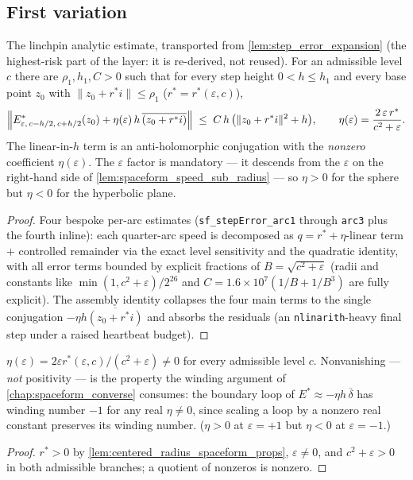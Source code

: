 \subsection{First variation}

\begin{lemma}
  \label{lem:spaceform_step_error_expansion}
  The linchpin analytic estimate, transported from
  \cref{lem:step_error_expansion} (the highest-risk part of the layer: it is
  re-derived, not reused). For an admissible level $c$ there are
  $\rho_1,h_1,C>0$ such that for every step height $0<h\le h_1$ and every
  base point $z_0$ with $\|z_0+r^\ast i\|\le\rho_1$
  ($r^\ast=r^\ast(\varepsilon,c)$),
  \[
    \Bigl\|E^\ast_{\varepsilon,\,c-h/2,\,c+h/2}(z_0)
      +\eta(\varepsilon)\,h\,\overline{(z_0+r^\ast i)}\Bigr\|
    \;\le\; C\,h\,\bigl(\|z_0+r^\ast i\|^2+h\bigr),
    \qquad
    \eta(\varepsilon)=\frac{2\,\varepsilon\, r^\ast}{c^2+\varepsilon}.
  \]
  The linear-in-$h$ term is an anti-holomorphic conjugation with the
  \emph{nonzero} coefficient $\eta(\varepsilon)$. The $\varepsilon$ factor is
  mandatory — it descends from the $\varepsilon$ on the right-hand side of
  \cref{lem:spaceform_speed_sub_radius} — so $\eta>0$ for the sphere but
  $\eta<0$ for the hyperbolic plane.
\end{lemma}

\begin{proof}
  \leanok
  Four bespoke per-arc estimates (\texttt{sf\_stepError\_arc1} through
  \texttt{arc3} plus the fourth inline): each quarter-arc speed is
  decomposed as
  $q=r^\ast+\eta$-linear term $+$ controlled remainder via the exact level
  sensitivity and the quadratic identity, with all error terms bounded by
  explicit fractions of $B=\sqrt{c^2+\varepsilon}$ (radii and constants like
  $\min(1,c^2+\varepsilon)/2^{26}$ and $C=1.6\times10^7(1/B+1/B^3)$ are
  fully explicit). The assembly identity collapses the four main terms to
  the single conjugation $-\eta h\overline{(z_0+r^\ast i)}$ and absorbs the
  residuals (an \texttt{nlinarith}-heavy final step under a raised
  heartbeat budget).
\end{proof}

\begin{lemma}
  \label{lem:spaceform_step_error_coeff_ne_zero}
  $\eta(\varepsilon)=2\varepsilon r^\ast(\varepsilon,c)/(c^2+\varepsilon)
  \ne0$ for every admissible level $c$. Nonvanishing — \emph{not}
  positivity — is the property the winding argument of
  \cref{chap:spaceform_converse} consumes: the boundary loop of
  $E^\ast\approx-\eta h\,\overline{\delta}$ has winding number $-1$ for any
  real $\eta\ne0$, since scaling a loop by a nonzero real constant preserves
  its winding number. ($\eta>0$ at $\varepsilon=+1$ but $\eta<0$ at
  $\varepsilon=-1$.)
\end{lemma}

\begin{proof}
  \leanok
  $r^\ast>0$ by \cref{lem:centered_radius_spaceform_props}, $\varepsilon\ne0$,
  and $c^2+\varepsilon>0$ in both admissible branches; a quotient of
  nonzeros is nonzero.
\end{proof}
